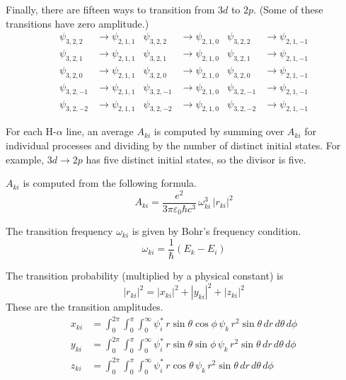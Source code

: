 \documentclass[12pt]{article}
\begin{document}
Finally, there are fifteen ways to transition from $3d$ to $2p$.
(Some of these transitions have zero amplitude.)
\begin{align*}
\psi_{3,2,2}&\rightarrow\psi_{2,1,1} &
\psi_{3,2,2}&\rightarrow\psi_{2,1,0} &
\psi_{3,2,2}&\rightarrow\psi_{2,1,-1}
\\
\psi_{3,2,1}&\rightarrow\psi_{2,1,1} &
\psi_{3,2,1}&\rightarrow\psi_{2,1,0} &
\psi_{3,2,1}&\rightarrow\psi_{2,1,-1}
\\
\psi_{3,2,0}&\rightarrow\psi_{2,1,1} &
\psi_{3,2,0}&\rightarrow\psi_{2,1,0} &
\psi_{3,2,0}&\rightarrow\psi_{2,1,-1}
\\
\psi_{3,2,-1}&\rightarrow\psi_{2,1,1} &
\psi_{3,2,-1}&\rightarrow\psi_{2,1,0} &
\psi_{3,2,-1}&\rightarrow\psi_{2,1,-1}
\\
\psi_{3,2,-2}&\rightarrow\psi_{2,1,1} &
\psi_{3,2,-2}&\rightarrow\psi_{2,1,0} &
\psi_{3,2,-2}&\rightarrow\psi_{2,1,-1}
\end{align*}

For each H-$\alpha$ line, an average $A_{ki}$ is computed by summing over $A_{ki}$ for individual processes
and dividing by the number of distinct initial states.
For example, $3d\rightarrow2p$ has five distinct initial states, so the divisor is five.

\bigskip
$A_{ki}$ is computed from the following formula.
\begin{equation*}
A_{ki}=\frac{e^2}{3\pi\varepsilon_0\hbar c^3}\,\omega_{ki}^3\,|r_{ki}|^2
\end{equation*}

The transition frequency $\omega_{ki}$ is given by Bohr's frequency condition.
\begin{equation*}
\omega_{ki}=\frac{1}{\hbar}(E_k-E_i)
\end{equation*}

The transition probability (multiplied by a physical constant) is
\begin{equation*}
|r_{ki}|^2
=|x_{ki}|^2
+|y_{ki}|^2
+|z_{ki}|^2
\end{equation*}
These are the transition amplitudes.
\begin{align*}
x_{ki}&=\int_0^{2\pi}\int_0^\pi\int_0^\infty
\psi_i^*\,r\sin\theta\cos\phi\,\psi_k
\,r^2\sin\theta\,dr\,d\theta\,d\phi
\\
y_{ki}&=\int_0^{2\pi}\int_0^\pi\int_0^\infty
\psi_i^*\,r\sin\theta\sin\phi\,\psi_k
\,r^2\sin\theta\,dr\,d\theta\,d\phi
\\
z_{ki}&=\int_0^{2\pi}\int_0^\pi\int_0^\infty
\psi_i^*\,r\cos\theta\,\psi_k
\,r^2\sin\theta\,dr\,d\theta\,d\phi
\end{align*}
\end{document}
